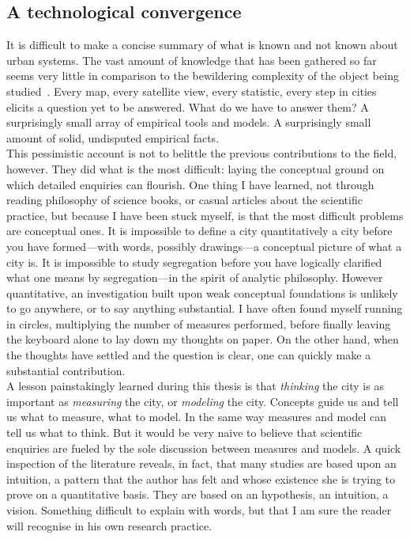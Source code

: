     \subsection{A technological convergence}
    \label{sub:a_technological_convergence} 

It is difficult to make a concise summary of what is known and not known about
urban systems. The vast amount of knowledge that has been gathered so far seems
very little in comparison to the bewildering complexity of the object being
studied~\cite{Batty:2008}. Every map, every satellite view, every statistic, every step
in cities elicits a question yet to be answered. What do we have to answer them?
A surprisingly small array of empirical tools and models. A surprisingly small
amount of solid, undisputed empirical facts.\\

This pessimistic account is not to belittle the previous contributions to the
field, however. They did what is the most difficult: laying the conceptual
ground on which detailed enquiries can flourish. One thing I have learned, not
through reading philosophy of science books, or casual articles about the
scientific practice, but because I have been stuck myself, is that the most
difficult problems are conceptual ones. It is impossible to define a city
quantitatively a city before you have formed---with words, possibly drawings---a
conceptual picture of what a city is. It is impossible to study segregation
before you have logically clarified what one means by segregation---in the
spirit of analytic philosophy. However quantitative, an investigation built upon
weak conceptual foundations is unlikely to go anywhere, or to say anything
substantial. I have often found myself running in circles, multiplying the
number of measures performed, before finally leaving the keyboard alone to lay
down my thoughts on paper. On the other hand, when the thoughts have settled and
the question is clear, one can quickly make a substantial contribution.\\

A lesson painstakingly learned during this thesis is that \emph{thinking} the
city is as important as \emph{measuring} the city, or \emph{modeling} the city.
Concepts guide us and tell us what to measure, what to model. In the same way
measures and model can tell us what to think. But it would be very naive to
believe that scientific enquiries are fueled by the sole discussion between
measures and models. A quick inspection of the literature reveals, in fact, that
many studies are based upon an intuition, a pattern that the author has felt and
whose existence she is trying to prove on a quantitative basis. They are based
on an hypothesis, an intuition, a vision. Something difficult to explain with
words, but that I am sure the reader will recognise in his own research
practice.
